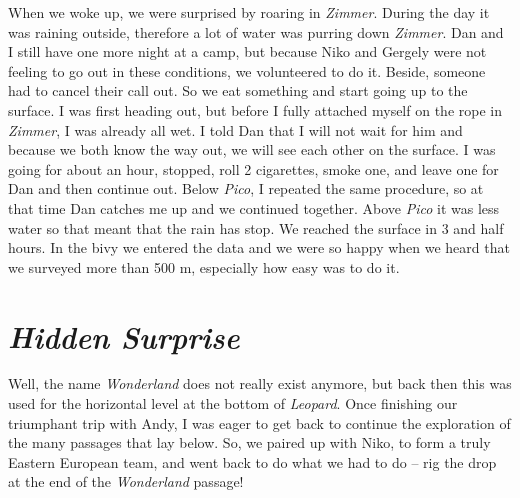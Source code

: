 When we woke up, we were surprised by roaring in \emph{Zimmer}. During
the day it was raining outside, therefore a lot of water was purring
down \emph{Zimmer}. Dan and I still have one more night at a camp, but
because Niko and Gergely were not feeling to go out in these conditions,
we volunteered to do it. Beside, someone had to cancel their call out.
So we eat something and start going up to the surface. I was first
heading out, but before I fully attached myself on the rope in
\emph{Zimmer}, I was already all wet. I told Dan that I will not wait
for him and because we both know the way out, we will see each other on
the surface. I was going for about an hour, stopped, roll 2 cigarettes,
smoke one, and leave one for Dan and then continue out. Below
\emph{Pico}, I repeated the same procedure, so at that time Dan catches
me up and we continued together. Above \emph{Pico} it was less water so
that meant that the rain has stop. We reached the surface in 3 and half
hours. In the bivy we entered the data and we were so happy when we
heard that we surveyed more than 500 m, especially how easy was to do
it.

\attrib{\izi}

\hypertarget{hidden-surprise}{%
\section{\texorpdfstring{\emph{Hidden
Surprise}}{Hidden Surprise}}\label{hidden-surprise}}

Well, the name \emph{Wonderland} does not really exist anymore, but back
then this was used for the horizontal level at the bottom of
\emph{Leopard}. Once finishing our triumphant trip with Andy, I was
eager to get back to continue the exploration of the many passages that
lay below. So, we paired up with Niko, to form a truly Eastern European
team, and went back to do what we had to do -- rig the drop at the end
of the \emph{Wonderland} passage!

